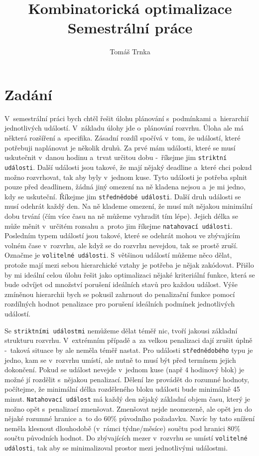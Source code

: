 \documentclass[a4paper,11pt]{article}
\author{Tomáš Trnka}
\title{Kombinatorická optimalizace\\Semestrální práce}
\begin{document}
\maketitle
\section*{Zadání}
V~semestrální práci bych chtěl řešit úlohu plánování s~podmínkami a~hierarchií jednotlivých událostí. V~základu úlohy jde o~plánování rozvrhu. Úloha ale má některá rozšíření a~specifika. Zásadní rozdíl spočívá v~tom, že událostí, které potřebuji naplánovat je několik druhů. Za prvé mám události, které se musí uskutečnit v~danou hodinu a~trvat určitou dobu -~říkejme jim \texttt{striktní události}. Další události jsou takové, že mají nějaký deadline a~které chci pokud možno rozvrhovat, tak aby byly v~jednom kuse. Tyto události je potřeba splnit pouze před deadlinem, žádná jiný omezení na ně kladena nejsou a~je mi jedno, kdy se uskuteční. Říkejme jim \texttt{střednědobé události}. Další druh události se musí odehrát každý den. Na ně klademe omezení, že musí mít nějakou minimální dobu trvání (čím více času na ně můžeme vyhradit tím lépe). Jejich délka se může měnit v~určitém rozsahu a~proto jim říkejme \texttt{natahovací události}. Posledním typem událostí jsou takové, které se odehrát mohou ve zbývajícím volném čase v~rozvrhu, ale když se do rozvrhu nevejdou, tak se prostě zruší. Označme je \texttt{volitelné události}. S~většinou událostí můžeme něco dělat, protože mají mezi sebou hierarchické vztahy  je potřeba je nějak zakódovat. Přišlo by mi ideální celou úlohu řešit jako optimalizaci nějaké kriteriální funkce, která se bude odvíjet od množství porušení ideálních stavů pro každou událost. Výše zmíněnou hierarchii bych se pokusil zahrnout do penalizační funkce pomocí rozdílných hodnot penalizace pro porušení ideálních podmínek jednotlivých událostí.
  
Se \texttt{striktními událostmi} nemůžeme dělat téměř nic, tvoří jakousi základní strukturu rozvrhu. V~ex\-trémním případě a~za velkou penalizaci dají zrušit úplně -~taková situace by ale neměla téměř nastat. Pro události \texttt{střednědobého} typu je jedno, kam se v~rozvrhu umístí, ale nutně to musí být před termínem jejich dokončení. Pokud se událost nevejde v~jednom kuse (např 4 hodinový blok) je možné jí rozdělit s~nějakou penalizací. Dělení lze provádět do rozumné hodnoty, počítejme, že minimální délka rozděleného bloku události bude minimálně 45 minut. \texttt{Natahovací událost} má každý den nějaký základní objem času, který je možno opět s~penalizací zmenšovat. Zmenšovat nejde neomezeně, ale opět jen do nějaké rozumné hranice a~to do 60\% původního požadavku. Navíc by tato snížení neměla klesnout dlouhodobě (v~rámci týdne/měsíce) součtu pod hranici 80\% součtu původních hodnot. Do zbývajících mezer v~rozvrhu se umístí \texttt{volitelné události}, tak aby se minimalizoval prostor mezi jednotlivými událostmi. 
\end{document}
